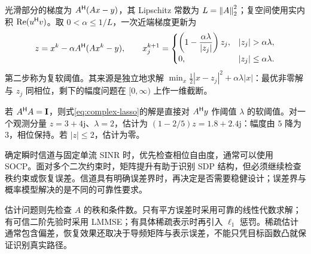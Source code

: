 光滑部分的梯度为 $A^\mathsf H(Ax-y)$，其 Lipschitz 常数为 $L=\left\lVert A\right\rVert_2^2$；复空间使用实内积 $\operatorname{Re}(u^\mathsf H v)$。取 $0<\alpha\leq1/L$，一次近端梯度更新为
\begin{equation}
 z=x^k-\alpha A^\HH(Ax^k-y),\qquad
 x_j^{k+1}=\begin{cases}
 \left(1-\dfrac{\alpha\lambda}{|z_j|}\right)z_j,&|z_j|>\alpha\lambda,\\
 0,&|z_j|\leq\alpha\lambda.
 \end{cases}
 \label{eq:complex-soft}
\end{equation}
第二步称为复软阈值。其来源是独立地求解
$\min_x\frac12|x-z_j|^2+\alpha\lambda|x|$：最优非零解与 $z_j$ 同相位，剩下的幅度问题在 $[0,\infty)$ 上作一维截断。

\begin{example}[正交导频下的阈值解]
若 $A^\mathsf H A=\mathbf I$，则式\eqref{eq:complex-lasso}的解是直接对 $A^\mathsf H y$ 作阈值 $\lambda$ 的软阈值。对一个观测分量 $z=3+4\mathrm j$、$\lambda=2$，估计为 $(1-2/5)z=1.8+2.4\mathrm j$：幅度由 $5$ 降为 $3$，相位保持。若 $|z|\leq2$，估计为零。
\end{example}

确定瞬时信道与固定单流 SINR 时，优先检查相位自由度，通常可以使用 SOCP。面对多个二次约束时，矩阵提升有助于识别 SDP 结构，但必须继续检查秩约束或恢复误差。信道具有明确误差界时，再决定是否需要稳健设计；误差界与概率模型解决的是不同的可靠性要求。

估计问题则先检查 $A$ 的秩和条件数。只有平方误差时采用可靠的线性代数求解；有可信二阶先验时采用 LMMSE；有具体稀疏表示时再引入 $\ell_1$ 惩罚。稀疏估计通常包含偏差，恢复效果还取决于导频矩阵与表示误差，不能只凭目标函数凸就保证识别真实路径。
